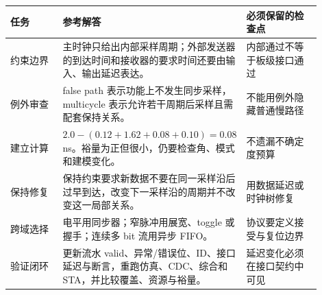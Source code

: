 \begin{longtable}{L{0.18\linewidth}L{0.46\linewidth}L{0.26\linewidth}}
\toprule
任务 & 参考解答 & 必须保留的检查点 \\
\midrule
约束边界 & 主时钟只给出内部采样周期；外部发送器的到达时间和接收器的要求时间还要由输入、输出延迟表达。 & 内部通过不等于板级接口通过 \\
例外审查 & false path 表示功能上不发生同步采样，multicycle 表示允许若干周期后采样且需配套保持关系。 & 不能用例外隐藏普通慢路径 \\
建立计算 & $2.0-(0.12+1.62+0.08+0.10)=0.08$ ns。裕量为正但很小，仍要检查角、模式和建模变化。 & 不遗漏不确定度预算 \\
保持修复 & 保持约束要求新数据不要在同一采样沿后过早到达，改变下一采样沿的周期并不改变这一局部关系。 & 用数据延迟或时钟树修复 \\
跨域选择 & 电平用同步器；窄脉冲用展宽、toggle 或握手；连续多 bit 流用异步 FIFO。 & 协议要定义接受与复位边界 \\
验证闭环 & 更新流水 valid、异常/错误位、ID、接口延迟与断言，重跑仿真、CDC、综合和 STA，并比较覆盖、资源与裕量。 & 延迟变化必须在接口契约中可见 \\
\bottomrule
\end{longtable}
